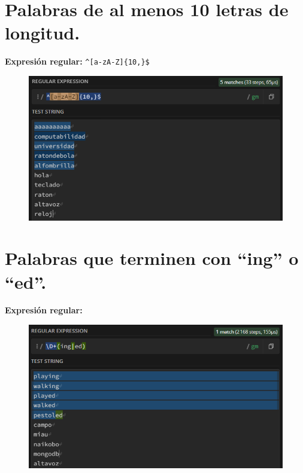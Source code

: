\documentclass[11pt]{report}
\begin{document}
\newpage

\section{Palabras de al menos 10 letras de longitud.}
\textbf{Expresión regular:} \verb|^[a-zA-Z]{10,}$|
  \begin{figure}[H]
    \centering
    \includegraphics[scale=0.75]{img/op_extendidos_09.png}
  \end{figure}

\section{Palabras que terminen con “ing” o “ed”.}
\textbf{Expresión regular:} 
  \begin{figure}[H]
    \centering
    \includegraphics[scale=0.75]{img/op_extendidos_10.png}
  \end{figure}
\end{document}

